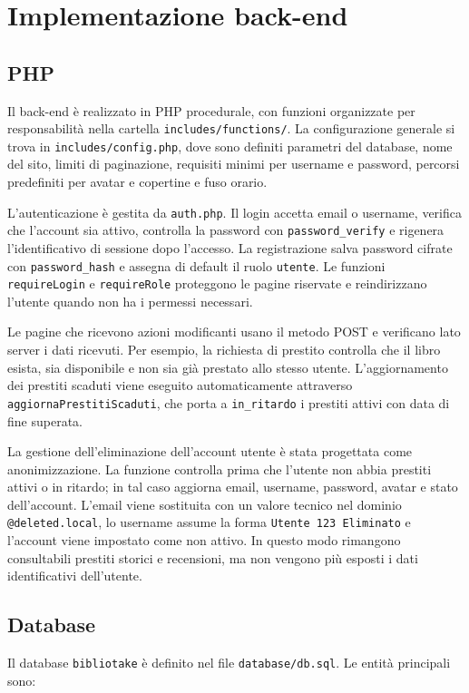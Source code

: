 ﻿\documentclass{article}
\begin{document}
\newpage

\section{Implementazione back-end}

\subsection{PHP}
Il back-end è realizzato in PHP procedurale, con funzioni organizzate per responsabilità nella cartella \texttt{includes/functions/}. La configurazione generale si trova in \texttt{includes/config.php}, dove sono definiti parametri del database, nome del sito, limiti di paginazione, requisiti minimi per username e password, percorsi predefiniti per avatar e copertine e fuso orario.

L'autenticazione è gestita da \texttt{auth.php}. Il login accetta email o username, verifica che l'account sia attivo, controlla la password con \texttt{password\_verify} e rigenera l'identificativo di sessione dopo l'accesso. La registrazione salva password cifrate con \texttt{password\_hash} e assegna di default il ruolo \texttt{utente}. Le funzioni \texttt{requireLogin} e \texttt{requireRole} proteggono le pagine riservate e reindirizzano l'utente quando non ha i permessi necessari.

Le pagine che ricevono azioni modificanti usano il metodo POST e verificano lato server i dati ricevuti. Per esempio, la richiesta di prestito controlla che il libro esista, sia disponibile e non sia già prestato allo stesso utente. L'aggiornamento dei prestiti scaduti viene eseguito automaticamente attraverso \texttt{aggiornaPrestitiScaduti}, che porta a \texttt{in\_ritardo} i prestiti attivi con data di fine superata.

La gestione dell'eliminazione dell'account utente è stata progettata come anonimizzazione. La funzione controlla prima che l'utente non abbia prestiti attivi o in ritardo; in tal caso aggiorna email, username, password, avatar e stato dell'account. L'email viene sostituita con un valore tecnico nel dominio \texttt{@deleted.local}, lo username assume la forma \texttt{Utente 123 Eliminato} e l'account viene impostato come non attivo. In questo modo rimangono consultabili prestiti storici e recensioni, ma non vengono più esposti i dati identificativi dell'utente.

\subsection{Database}
Il database \texttt{bibliotake} è definito nel file \texttt{database/db.sql}. Le entità principali sono:
\end{document}
